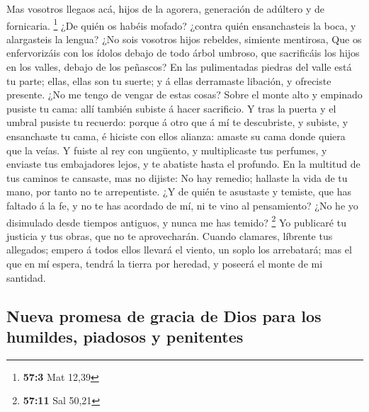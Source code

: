  Mas vosotros llegaos acá, hijos de la agorera, generación
de adúltero y de fornicaria. \footnote{\textbf{57:3} Mat 12,39}
 ¿De quién os habéis mofado? ¿contra quién ensanchasteis
la boca, y alargasteis la lengua? ¿No sois vosotros hijos rebeldes,
simiente mentirosa,  Que os enfervorizáis con los ídolos
debajo de todo árbol umbroso, que sacrificáis los hijos en los valles,
debajo de los peñascos?  En las pulimentadas piedras del
valle está tu parte; ellas, ellas son tu suerte; y á ellas derramaste
libación, y ofreciste presente. ¿No me tengo de vengar de estas cosas?
 Sobre el monte alto y empinado pusiste tu cama: allí
también subiste á hacer sacrificio.  Y tras la puerta y el
umbral pusiste tu recuerdo: porque á otro que á mí te descubriste, y
subiste, y ensanchaste tu cama, é hiciste con ellos alianza: amaste su
cama donde quiera que la veías.  Y fuiste al rey con
ungüento, y multiplicaste tus perfumes, y enviaste tus embajadores
lejos, y te abatiste hasta el profundo.  En la multitud
de tus caminos te cansaste, mas no dijiste: No hay remedio; hallaste la
vida de tu mano, por tanto no te arrepentiste.  ¿Y de
quién te asustaste y temiste, que has faltado á la fe, y no te has
acordado de mí, ni te vino al pensamiento? ¿No he yo disimulado desde
tiempos antiguos, y nunca me has temido? \footnote{\textbf{57:11} Sal
  50,21}  Yo publicaré tu justicia y tus obras, que no te
aprovecharán.  Cuando clamares, líbrente tus allegados;
empero á todos ellos llevará el viento, un soplo los arrebatará; mas el
que en mí espera, tendrá la tierra por heredad, y poseerá el monte de mi
santidad.

\hypertarget{nueva-promesa-de-gracia-de-dios-para-los-humildes-piadosos-y-penitentes}{%
\subsection{Nueva promesa de gracia de Dios para los humildes, piadosos
y
penitentes}\label{nueva-promesa-de-gracia-de-dios-para-los-humildes-piadosos-y-penitentes}}

